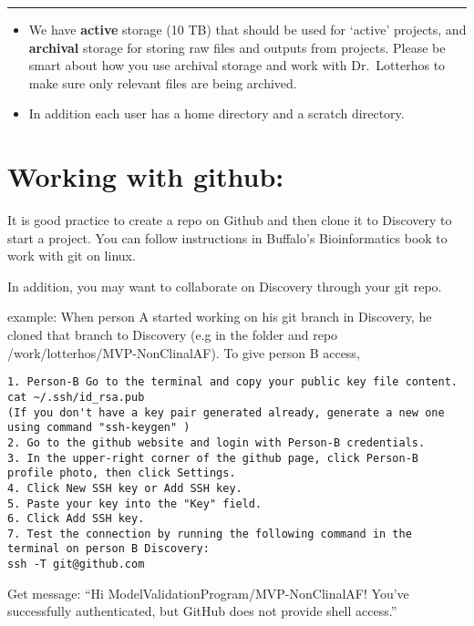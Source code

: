 \documentclass[
  letterpaper,
  DIV=11,
  numbers=noendperiod]{scrreprt}
\begin{document}
\begin{center}\rule{0.5\linewidth}{0.5pt}\end{center}

\begin{itemize}
\item
  We have \textbf{active} storage (10 TB) that should be used for
  `active' projects, and \textbf{archival} storage for storing raw files
  and outputs from projects. Please be smart about how you use archival
  storage and work with Dr.~Lotterhos to make sure only relevant files
  are being archived.
\item
  In addition each user has a home directory and a scratch directory.
\end{itemize}

\hypertarget{working-with-github}{%
\section*{\texorpdfstring{\textbf{Working with
github:}}{Working with github:}}\label{working-with-github}}


It is good practice to create a repo on Github and then clone it to
Discovery to start a project. You can follow instructions in Buffalo's
Bioinformatics book to work with git on linux.

In addition, you may want to collaborate on Discovery through your git
repo.

example: When person A started working on his git branch in Discovery,
he cloned that branch to Discovery (e.g in the folder and repo
/work/lotterhos/MVP-NonClinalAF). To give person B access,

\begin{verbatim}
1. Person-B Go to the terminal and copy your public key file content.
cat ~/.ssh/id_rsa.pub
(If you don't have a key pair generated already, generate a new one using command "ssh-keygen" )
2. Go to the github website and login with Person-B credentials.
3. In the upper-right corner of the github page, click Person-B profile photo, then click Settings.
4. Click New SSH key or Add SSH key.
5. Paste your key into the "Key" field.
6. Click Add SSH key.
7. Test the connection by running the following command in the terminal on person B Discovery:
ssh -T git@github.com 
\end{verbatim}

Get message: ``Hi ModelValidationProgram/MVP-NonClinalAF! You've
successfully authenticated, but GitHub does not provide shell access.''
\end{document}
